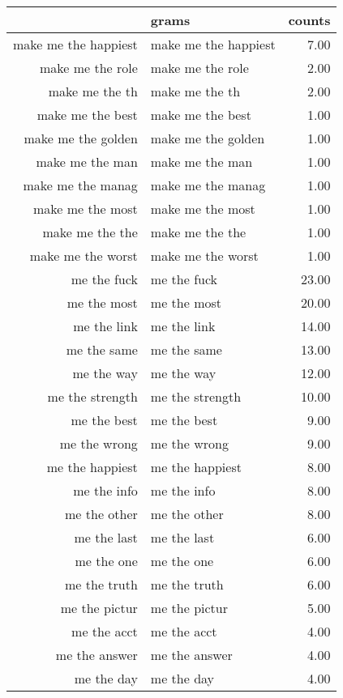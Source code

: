 \begin{table}[ht]
\centering
\begin{tabular}{rlr}
  \hline
 & grams & counts \\ 
  \hline
make me the happiest & make me the happiest & 7.00 \\ 
  make me the role & make me the role & 2.00 \\ 
  make me the th & make me the th & 2.00 \\ 
  make me the best & make me the best & 1.00 \\ 
  make me the golden & make me the golden & 1.00 \\ 
  make me the man & make me the man & 1.00 \\ 
  make me the manag & make me the manag & 1.00 \\ 
  make me the most & make me the most & 1.00 \\ 
  make me the the & make me the the & 1.00 \\ 
  make me the worst & make me the worst & 1.00 \\ 
  me the fuck & me the fuck & 23.00 \\ 
  me the most & me the most & 20.00 \\ 
  me the link & me the link & 14.00 \\ 
  me the same & me the same & 13.00 \\ 
  me the way & me the way & 12.00 \\ 
  me the strength & me the strength & 10.00 \\ 
  me the best & me the best & 9.00 \\ 
  me the wrong & me the wrong & 9.00 \\ 
  me the happiest & me the happiest & 8.00 \\ 
  me the info & me the info & 8.00 \\ 
  me the other & me the other & 8.00 \\ 
  me the last & me the last & 6.00 \\ 
  me the one & me the one & 6.00 \\ 
  me the truth & me the truth & 6.00 \\ 
  me the pictur & me the pictur & 5.00 \\ 
  me the acct & me the acct & 4.00 \\ 
  me the answer & me the answer & 4.00 \\ 
  me the day & me the day & 4.00 \\ 

\end{tabular}
\end{table}
